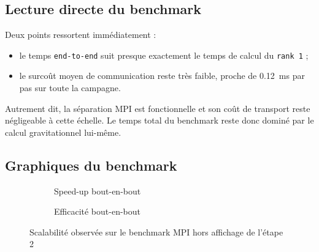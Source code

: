 \begin{table}[H]
    \centering
    \caption{Résultats du benchmark MPI sans affichage}
    \label{tab:stage2_results}
\end{table}

\subsection{Lecture directe du benchmark}

Deux points ressortent immédiatement :
\begin{itemize}
    \item le temps \texttt{end-to-end} suit presque exactement le temps de calcul du \texttt{rank 1} ;
    \item le surcoût moyen de communication reste très faible, proche de \SI{0.12}{ms} par pas sur toute la campagne.
\end{itemize}

Autrement dit, la séparation MPI est fonctionnelle et son coût de transport reste négligeable à cette échelle. Le temps total du benchmark reste donc dominé par le calcul gravitationnel lui-même.

\subsection{Graphiques du benchmark}

\begin{figure}[H]
    \centering
    \begin{subfigure}[t]{0.48\linewidth}
        \centering
        
        \caption{Speed-up bout-en-bout}
        \label{fig:stage2_speedup}
    \end{subfigure}
    \hfill
    \begin{subfigure}[t]{0.48\linewidth}
        \centering
        
        \caption{Efficacité bout-en-bout}
        \label{fig:stage2_efficiency}
    \end{subfigure}
    \caption{Scalabilité observée sur le benchmark MPI hors affichage de l'étape 2}
    \label{fig:stage2_scaling}
\end{figure}
